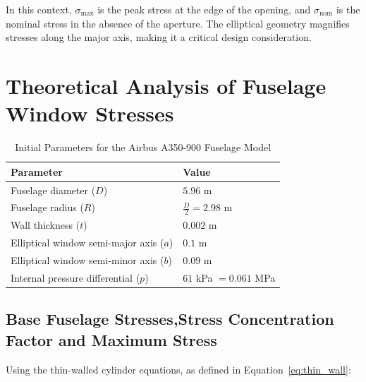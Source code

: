 \documentclass[a4paper,11pt]{article}
\begin{document}
In this context, \(\sigma_{\text{max}}\) is the peak stress at the edge of the opening, and \(\sigma_{\text{nom}}\) is the nominal stress in the absence of the aperture. The elliptical geometry magnifies stresses along the major axis, making it a critical design consideration.



     
 
 

  



   
 \vspace{-10pt}


\section{Theoretical Analysis of Fuselage Window Stresses}
 \vspace{-10pt}

 \vspace{-10pt}
\begin{table}[h!]
\centering
\begin{tabular}{|l|l|}
\hline
\textbf{Parameter}                & \textbf{Value}                    \\ \hline
Fuselage diameter ($D$)           & $5.96$ m                          \\ \hline
Fuselage radius ($R$)             & $\frac{D}{2} = 2.98$ m            \\ \hline
Wall thickness ($t$)              & $0.002$ m                         \\ \hline
Elliptical window semi-major axis ($a$) & $0.1$ m                          \\ \hline
Elliptical window semi-minor axis ($b$) & $0.09$ m                         \\ \hline
Internal pressure differential ($p$)   & $61$ kPa $= 0.061$ MPa           \\ \hline
\end{tabular}
\caption{Initial Parameters for the Airbus A350-900 Fuselage Model}
\label{tab:initial_parameters}
\end{table}
 \vspace{-20pt}
 
 

\subsection{Base Fuselage Stresses,Stress Concentration Factor and Maximum Stress}
 \vspace{-10pt}
Using the thin-walled cylinder equations, as defined in 
Equation~\ref{eq:thin_wall}:
\end{document}
